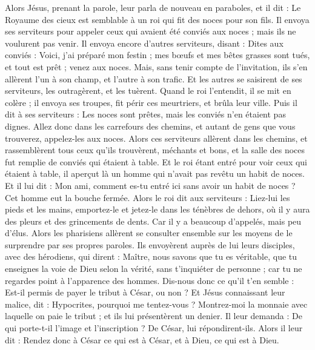 \begin{multicols}{2}
\VerseOne{}Alors Jésus, prenant la parole, leur parla de nouveau en paraboles, et il dit :
Le Royaume des cieux est semblable à un roi qui fit des noces pour son fils.
Il envoya ses serviteurs pour appeler ceux qui avaient été conviés aux noces ; mais ils ne voulurent pas venir.
Il envoya encore d'autres serviteurs, disant : Dites aux conviés : Voici, j'ai préparé mon festin ; mes bœufs et mes bêtes grasses sont tués, et tout est prêt ; venez aux noces.
Mais, sans tenir compte de l’invitation, ils s’en allèrent l'un à son champ, et l'autre à son trafic.
Et les autres se saisirent de ses serviteurs, les outragèrent, et les tuèrent.
Quand le roi l'entendit, il se mit en colère ; il envoya ses troupes, fit périr ces meurtriers, et brûla leur ville.
Puis il dit à ses serviteurs : Les noces sont prêtes, mais les conviés n’en étaient pas dignes.
Allez donc dans les carrefours des chemins, et autant de gens que vous trouverez, appelez-les aux noces.
Alors ces serviteurs allèrent dans les chemins, et rassemblèrent tous ceux qu'ils trouvèrent, méchants et bons, et la salle des noces fut remplie de conviés qui étaient à table.
Et le roi étant entré pour voir ceux qui étaient à table, il aperçut là un homme qui n’avait pas revêtu un habit de noces.
Et il lui dit : Mon ami, comment es-tu entré ici sans avoir un habit de noces ? Cet homme eut la bouche fermée.
Alors le roi dit aux serviteurs : Liez-lui les pieds et les mains, emportez-le et jetez-le dans les ténèbres de dehors, où il y aura des pleurs et des grincements de dents.
Car il y a beaucoup d'appelés, mais peu d'élus.
Alors les pharisiens allèrent se consulter ensemble sur les moyens de le surprendre par ses propres paroles.
Ils envoyèrent auprès de lui leurs disciples, avec des hérodiens, qui dirent : Maître, nous savons que tu es véritable, que tu enseignes la voie de Dieu selon la vérité, sans t’inquiéter de personne ; car tu ne regardes point à l'apparence des hommes.
Dis-nous donc ce qu'il t’en semble : Est-il permis de payer le tribut à César, ou non ?
Et Jésus connaissant leur malice, dit : Hypocrites, pourquoi me tentez-vous ?
Montrez-moi la monnaie avec laquelle on paie le tribut ; et ils lui présentèrent un denier.
Il leur demanda : De qui porte-t-il l’image et l’inscription ?
De César, lui répondirent-ils. Alors il leur dit : Rendez donc à César ce qui est à César, et à Dieu, ce qui est à Dieu.

\end{multicols}
